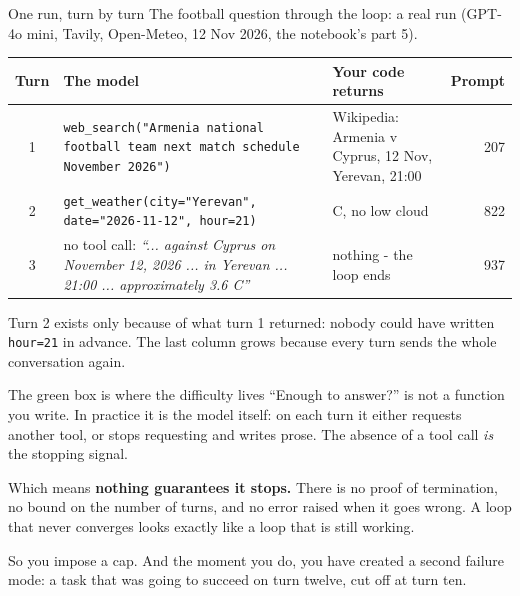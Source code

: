 \documentclass[aspectratio=169]{beamer}
\newcommand{\keybox}[1]{%
  \begin{tcolorbox}[colback=armblue!8, colframe=armblue, boxrule=0.6pt, arc=2pt]
  #1
  \end{tcolorbox}}
\newcommand{\trapbox}[1]{%
  \begin{tcolorbox}[colback=armred!8, colframe=armred, boxrule=0.6pt, arc=2pt]
  #1
  \end{tcolorbox}}
\begin{document}
\begin{frame}{One run, turn by turn}
  \vspace{0.2em}
  {\small The football question through the loop: a real run (GPT-4o mini, Tavily, Open-Meteo, 12 Nov 2026,
  the notebook's part 5).}

  \vspace{0.3em}
  \begin{center}
  \footnotesize
  \begin{tabular}{c>{\raggedright\arraybackslash}p{}>{\raggedright\arraybackslash}p{}r}
    \toprule
    \textbf{Turn} & \textbf{The model} & \textbf{Your code returns} & \textbf{Prompt} \\
    \midrule
    1 & \texttt{web\_search("Armenia national football team next match schedule November 2026")}
      & Wikipedia: Armenia v Cyprus, 12 Nov, Yerevan, 21:00 & 207 \\
    2 & \texttt{get\_weather(city="Yerevan", date="2026-11-12", hour=21)} & 3.6 C, no low cloud & 822 \\
    3 & no tool call: \emph{``... against Cyprus on November 12, 2026 ... in Yerevan ... 21:00 ...
      approximately 3.6 C''} & nothing - the loop ends & 937 \\
    \bottomrule
  \end{tabular}
  \end{center}

  \vspace{0.1em}
  \keybox{\small Turn 2 exists only because of what turn 1 returned: nobody could have written
  \texttt{hour=21} in advance. The last column grows because every turn sends the whole conversation
  again.}
\end{frame}

\begin{frame}{The green box is where the difficulty lives}
  \vspace{0.7em}
  ``Enough to answer?'' is not a function you write. In practice it is the model itself: on each
  turn it either requests another tool, or stops requesting and writes prose. The absence of a
  tool call \emph{is} the stopping signal.

  \vspace{0.9em}
  \trapbox{Which means \textbf{nothing guarantees it stops.} There is no proof of termination,
  no bound on the number of turns, and no error raised when it goes wrong. A loop that never
  converges looks exactly like a loop that is still working.}

  \vspace{0.8em}
  \keybox{So you impose a cap. And the moment you do, you have created a second failure mode:
  a task that was going to succeed on turn twelve, cut off at turn ten.}
\end{frame}
\end{document}
